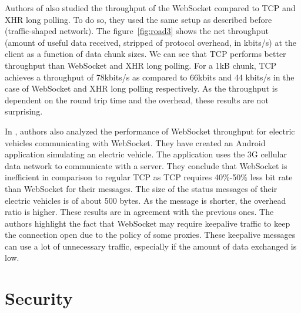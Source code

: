 \documentclass[10pt,journal,compsoc]{IEEEtran}
\newcommand{\ws}{WebSocket}
\begin{document}
Authors of \cite{roadblock} also studied the throughput of the \ws{} compared to TCP and XHR long polling.
To do so, they used the same setup as described before (traffic-shaped network).
The figure~\ref{fig:road3} shows the net throughput (amount of useful data received, stripped of protocol overhead, in kbits/s) at the client as a function of data chunk sizes.
We can see that TCP performs better throughput than \ws{} and XHR long polling.
For a 1kB chunk, TCP achieves a throughput of 78kbits/s as compared to 66kbits and 44 kbits/s in the case of \ws{} and XHR long polling respectively.
As the throughput is dependent on the round trip time and the overhead, these results are not surprising.

In \cite{EV}, authors also analyzed the performance of \ws{} throughput for electric vehicles communicating with \ws{}.
They have created an Android application simulating an electric vehicle.
The application uses the 3G cellular data network to communicate with a server.
They conclude that \ws{} is inefficient in comparison to regular TCP as TCP requires 40\%-50\% less bit rate than \ws{} for their messages.
The size of the status messages of their electric vehicles is of about 500 bytes.
As the message is shorter, the overhead ratio is higher.
These results are in agreement with the previous ones.
The authors highlight the fact that \ws{} may require keepalive traffic to keep the connection open due to the policy of some proxies. %
These keepalive messages can use a lot of unnecessary traffic, especially if the  amount of data exchanged is low. %


\section{Security}
\end{document}
